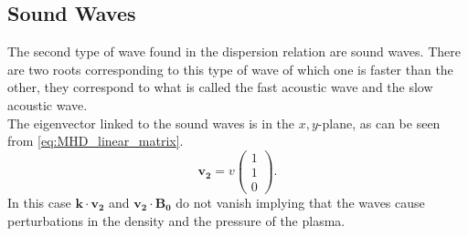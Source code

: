 \documentclass{article}
\begin{document}
\subsection{Sound Waves}
The second type of wave found in the dispersion relation are sound waves. There are two roots corresponding to this type of wave of which one is faster than the other, they correspond to what is called the fast acoustic wave and the slow acoustic wave.\\

The eigenvector linked to the sound waves is in the $x,y$-plane, as can be seen from \cref{eq:MHD_linear_matrix}.
\[
	\mathbf{v_2} = v \begin{pmatrix} 1 \\ 1 \\ 0 \end{pmatrix} 
.\] 
In this case $\mathbf{k\cdot v_2}$ and $\mathbf{v_2 \cdot B_0}$ do not vanish implying that the waves cause perturbations in the density and the pressure of the plasma.
\end{document}
